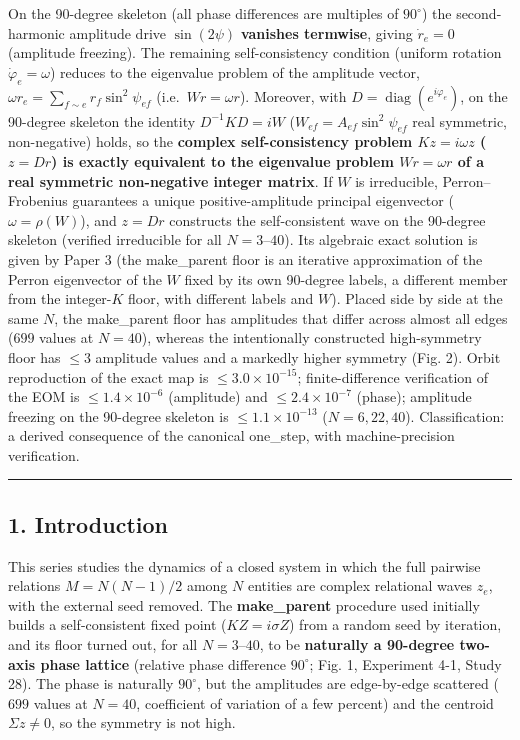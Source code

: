 \documentclass[
  a4paper,
]{ltjsarticle}
\begin{document}
On the 90-degree skeleton (all phase differences are multiples of
\(90^\circ\)) the second-harmonic amplitude drive \(\sin(2\psi)\)
\textbf{vanishes termwise}, giving \(\dot r_e=0\) (amplitude freezing).
The remaining self-consistency condition (uniform rotation
\(\dot\varphi_e=\omega\)) reduces to the eigenvalue problem of the
amplitude vector, \(\omega r_e=\sum_{f\sim e}r_f\sin^2\psi_{ef}\)
(i.e.~\(Wr=\omega r\)). Moreover, with
\(D=\operatorname{diag}(e^{i\varphi_e})\), on the 90-degree skeleton the
identity \(\boxed{D^{-1}KD=iW}\) (\(W_{ef}=A_{ef}\sin^2\psi_{ef}\) real
symmetric, non-negative) holds, so the \textbf{complex self-consistency
problem \(Kz=i\omega z\) (\(z=Dr\)) is exactly equivalent to the
eigenvalue problem \(Wr=\omega r\) of a real symmetric non-negative
integer matrix}. If \(W\) is irreducible, Perron--Frobenius guarantees a
unique positive-amplitude principal eigenvector (\(\omega=\rho(W)\)),
and \(z=Dr\) constructs the self-consistent wave on the 90-degree
skeleton (verified irreducible for all \(N=3\)--\(40\)). Its algebraic
exact solution is given by Paper 3 (the make\_parent floor is an
iterative approximation of the Perron eigenvector of the \(W\) fixed by
its own 90-degree labels, a different member from the integer-\(K\)
floor, with different labels and \(W\)). Placed side by side at the same
\(N\), the make\_parent floor has amplitudes that differ across almost
all edges (\(699\) values at \(N=40\)), whereas the intentionally
constructed high-symmetry floor has \(\le 3\) amplitude values and a
markedly higher symmetry (Fig. 2). Orbit reproduction of the exact map
is \(\le3.0\times10^{-15}\); finite-difference verification of the EOM
is \(\le1.4\times10^{-6}\) (amplitude) and \(\le2.4\times10^{-7}\)
(phase); amplitude freezing on the 90-degree skeleton is
\(\le1.1\times10^{-13}\) (\(N=6,22,40\)). Classification: a derived
consequence of the canonical one\_step, with machine-precision
verification.

\begin{center}\rule{0.5\linewidth}{0.5pt}\end{center}

\subsection{1. Introduction}\label{introduction}

This series studies the dynamics of a closed system in which the full
pairwise relations \(M=N(N-1)/2\) among \(N\) entities are complex
relational waves \(z_e\), with the external seed removed. The
\textbf{make\_parent} procedure used initially builds a self-consistent
fixed point (\(KZ=i\sigma Z\)) from a random seed by iteration, and its
floor turned out, for all \(N=3\)--\(40\), to be \textbf{naturally a
90-degree two-axis phase lattice} (relative phase difference
\(90^\circ\); Fig. 1, Experiment 4-1, Study 28). The phase is naturally
\(90^\circ\), but the amplitudes are edge-by-edge scattered (\(699\)
values at \(N=40\), coefficient of variation of a few percent) and the
centroid \(\Sigma z\neq0\), so the symmetry is not high.
\end{document}
